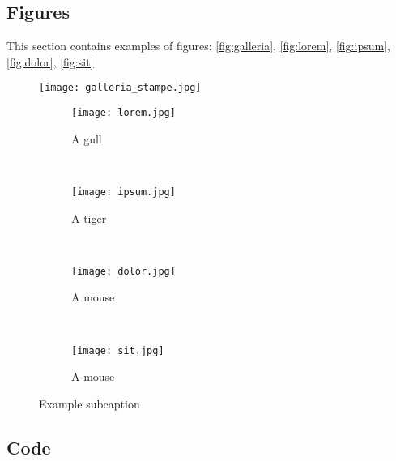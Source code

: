 \subsection{Figures}

This section contains examples of figures: \autoref{fig:galleria}, \autoref{fig:lorem}, \autoref{fig:ipsum}, \autoref{fig:dolor}, \autoref{fig:sit}

\begin{figure}[H] 
	\centering 
	\texttt{[image: galleria\_stampe.jpg]} 
	\label{fig:galleria} 
\end{figure}

\begin{figure}[H]
	\centering
	\begin{subfigure}[b]{0.45\textwidth}
		\texttt{[image: lorem.jpg]}
		\caption{A gull}
		\label{fig:lorem}
	\end{subfigure}
	~ %
	\begin{subfigure}[b]{0.45\textwidth}
		\texttt{[image: ipsum.jpg]}
		\caption{A tiger}
		\label{fig:ipsum}
	\end{subfigure}
	~ %
	\begin{subfigure}[b]{0.45\textwidth}
		\texttt{[image: dolor.jpg]}
		\caption{A mouse}
		\label{fig:dolor}
	\end{subfigure}
	~ %
	\begin{subfigure}[b]{0.45\textwidth}
		\texttt{[image: sit.jpg]}
		\caption{A mouse}
		\label{fig:sit}
	\end{subfigure}
	\caption{Example subcaption}\label{fig:animals}
\end{figure}


\subsection{Code}


